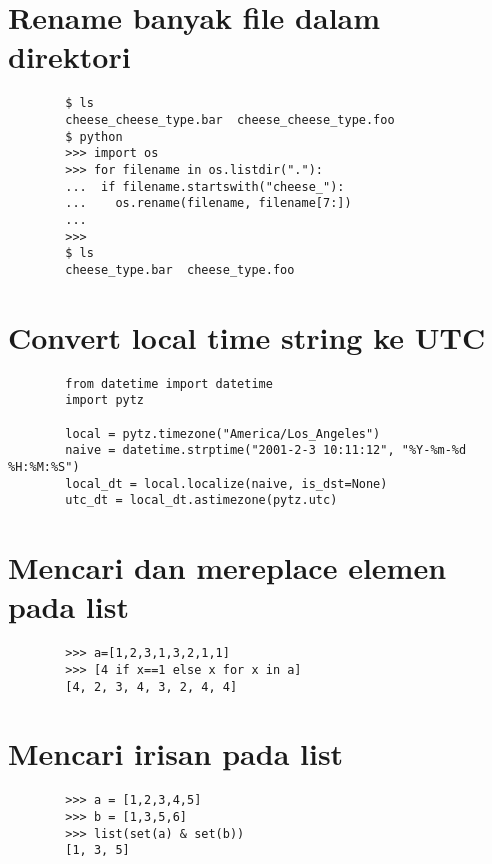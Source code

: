\documentclass{article}
\begin{document}
	\section {Rename banyak file dalam direktori}
	\begin{lstlisting}
		$ ls
		cheese_cheese_type.bar  cheese_cheese_type.foo
		$ python
		>>> import os
		>>> for filename in os.listdir("."):
		...  if filename.startswith("cheese_"):
		...    os.rename(filename, filename[7:])
		... 
		>>> 
		$ ls
		cheese_type.bar  cheese_type.foo
	\end{lstlisting}

	\section {Convert local time string ke UTC}
	\begin{lstlisting}
		from datetime import datetime   
		import pytz
		
		local = pytz.timezone("America/Los_Angeles")
		naive = datetime.strptime("2001-2-3 10:11:12", "%Y-%m-%d %H:%M:%S")
		local_dt = local.localize(naive, is_dst=None)
		utc_dt = local_dt.astimezone(pytz.utc)
	\end{lstlisting}

	\section {Mencari dan mereplace elemen pada list}
	\begin{lstlisting}
		>>> a=[1,2,3,1,3,2,1,1]
		>>> [4 if x==1 else x for x in a]
		[4, 2, 3, 4, 3, 2, 4, 4]
	\end{lstlisting}

	\section {Mencari irisan pada list}
	\begin{lstlisting}
		>>> a = [1,2,3,4,5]
		>>> b = [1,3,5,6]
		>>> list(set(a) & set(b))
		[1, 3, 5]
	\end{lstlisting}
	
\end{document}
